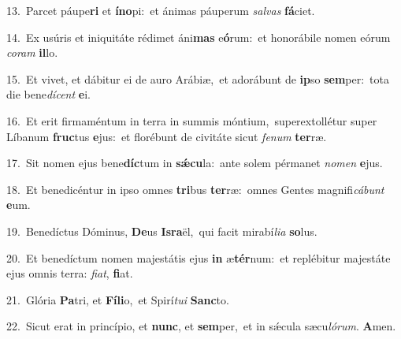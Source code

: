 {\numbfont\textcolor{\numbcolor}{13.}}~Parcet páupe\textbf{ri} et \textbf{ín}\-\textbf{o}pi:~\star et ánimas páuperum \textit{sal}\-\textit{vas} \textbf{fá}\-ciet.\par
{\numbfont\textcolor{\numbcolor}{14.}}~Ex usúris et iniquitáte rédimet áni\textbf{mas} e\-\textbf{ó}\-rum:~\star et honorábile nomen eórum \textit{co}\-\textit{ram} \textbf{il}\-lo.\par
{\numbfont\textcolor{\numbcolor}{15.}}~Et vivet, et dábitur ei de auro Arábiæ,~\dagger et adorábunt de \textbf{ip}\-so \textbf{sem}\-per:~\star tota die bene\-\textit{dí}\-\textit{cent} \textbf{e}\-i.\par
{\numbfont\textcolor{\numbcolor}{16.}}~Et erit firmaméntum in terra in summis móntium,~\dagger superextollétur super Líbanum \textbf{fruc}\-tus \textbf{e}\-jus:~\star et florébunt de civitáte sicut \textit{fe}\-\textit{num} \textbf{ter}\-ræ.\par
{\numbfont\textcolor{\numbcolor}{17.}}~Sit nomen ejus bene\-\textbf{díc}\-tum in \textbf{sǽ}\-\textbf{cu}la:~\star ante solem pérmanet \textit{no}\-\textit{men} \textbf{e}\-jus.\par
{\numbfont\textcolor{\numbcolor}{18.}}~Et benedicéntur in ipso omnes \textbf{tri}\-bus \textbf{ter}\-ræ:~\star omnes Gentes magnifi\-\textit{cá}\-\textit{bunt} \textbf{e}\-um.\par
{\numbfont\textcolor{\numbcolor}{19.}}~Benedíctus Dóminus, \textbf{De}\-us \textbf{Is}\-\textbf{ra}ël,~\star qui facit mirabí\-\textit{li}\-\textit{a} \textbf{so}\-lus.\par
{\numbfont\textcolor{\numbcolor}{20.}}~Et benedíctum nomen majestátis ejus \textbf{in} æ\-\textbf{tér}\-num:~\star et replébitur majestáte ejus omnis terra: \textit{fi}\-\textit{at}, \textbf{fi}\-at.\par
{\numbfont\textcolor{\numbcolor}{21.}}~Glória \textbf{Pa}\-tri, et \textbf{Fí}\-\textbf{li}o,~\star et Spirí\-\textit{tu}\-\textit{i} \textbf{Sanc}\-to.\par
{\numbfont\textcolor{\numbcolor}{22.}}~Sicut erat in princípio, et \textbf{nunc}\-, et \textbf{sem}\-per,~\star et in sǽcula sæcu\-\textit{ló}\-\textit{rum}. \textbf{A}\-men.\par
